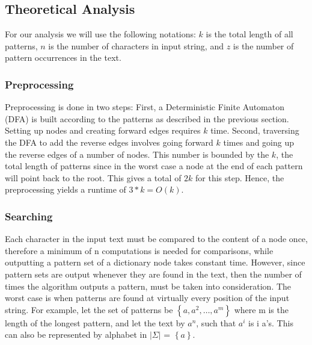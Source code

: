 \documentclass[paper=a4, fontsize=11pt]{scrartcl} %
\numberwithin{equation}{section} %
\numberwithin{figure}{section} %
\numberwithin{table}{section} %
\begin{document}
\subsection{Theoretical Analysis}
For our analysis we will use the following notations: $k$ is the total length of all patterns, $n$ is the number of characters in input string, and $z$ is the number of pattern occurrences in the text.

\subsubsection{Preprocessing}
\par Preprocessing is done in two steps:
First, a Deterministic Finite Automaton (DFA) is built according to the patterns as described in the previous section. Setting up nodes and creating forward edges requires $k$ time.
Second, traversing the DFA to add the reverse edges involves going forward $k$ times and going up the reverse edges of a number of nodes. This number is bounded by the $k$, the total length of patterns since in the worst case a node at the end of each pattern will point back to the root. This gives a total of $2k$ for this step. Hence, the preprocessing yields a runtime of  $3*k = O(k)$. 

\subsubsection{Searching}
\par Each character in the input text must be compared to the content of a node once, therefore a minimum of n computations is needed for comparisons, while outputting a pattern set of a dictionary node takes constant time. However, since pattern sets are output whenever they are found in the text, then the number of times the algorithm outputs a pattern, must be taken into consideration. The worst case is when patterns are found at virtually every position of the input string. For example, let the set of patterns be $\left\{a, a^2,\dots, a^m\right\}$ where m is the length of the longest pattern, and let the text by $a^n$, such that $a^i$ is i a's. This can also be represented by alphabet in $|\Sigma|$ = $\left\{a\right\}$.
\end{document}
